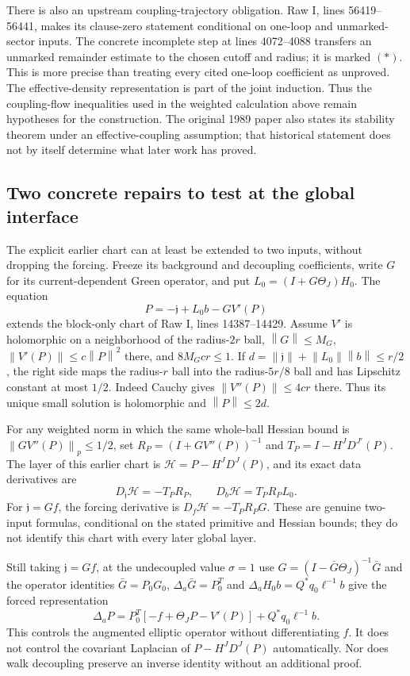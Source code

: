 \documentclass[11pt]{article}
\theoremstyle{remark}
\newcommand{\norm}[1]{\left\|#1\right\|}
\begin{document}
There is also an upstream coupling-trajectory obligation. Raw I,
lines 56419--56441, makes its clause-zero statement conditional on
one-loop and unmarked-sector inputs. The concrete incomplete step at
lines 4072--4088 transfers an unmarked remainder estimate to the chosen
cutoff and radius; it is marked $(*)$. This is more precise than
treating every cited one-loop coefficient as unproved. The
effective-density representation is part of the joint induction.
Thus the coupling-flow inequalities used in the weighted calculation
above remain hypotheses for the construction. The original 1989 paper
also states its stability theorem under an effective-coupling
assumption; that historical statement does not by itself determine
what later work has proved.

\subsection{Two concrete repairs to test at the global interface}

The explicit earlier chart can at least be extended to two inputs,
without dropping the forcing. Freeze its background and decoupling
coefficients, write $G$ for its current-dependent Green operator, and
put $L_0=(I+G\Theta_J)H_0$. The equation
\[
 P=-\mathfrak j+L_0b-GV'(P)
\]
extends the block-only chart of Raw I, lines 14387--14429.
Assume $V'$ is holomorphic on a neighborhood of the radius-$2r$ ball,
$\norm G\le M_G$, $\norm{V'(P)}\le c\norm P^2$ there, and
$8M_Gcr\le1$. If
$d=\norm{\mathfrak j}+\norm{L_0}\norm b\le r/2$, the right side
maps the radius-$r$ ball into the radius-$5r/8$ ball and has Lipschitz
constant at most $1/2$. Indeed Cauchy gives
$\norm{V''(P)}\le4cr$ there. Thus its unique small solution is
holomorphic and $\norm P\le2d$.

For any weighted norm in which the same whole-ball Hessian bound is
$\norm{GV''(P)}_p\le1/2$, set
$R_P=(I+GV''(P))^{-1}$ and
$T_P=I-H^JD^{J\prime}(P)$. The layer of this earlier chart is
$\mathcal H=P-H^JD^J(P)$, and its exact data derivatives are
\[
 D_{\mathfrak j}\mathcal H=-T_PR_P,\qquad
 D_b\mathcal H=T_PR_PL_0.
\]
For $\mathfrak j=Gf$, the forcing derivative is
$D_f\mathcal H=-T_PR_PG$.
These are genuine two-input formulas, conditional on the stated
primitive and Hessian bounds; they do not identify this chart with
every later global layer.

Still taking $\mathfrak j=Gf$, at the undecoupled value $\sigma=1$ use
$G=(I-\bar G\Theta_J)^{-1}\bar G$ and the operator identities
$\bar G=P_0G_0$, $\Delta_a\bar G=P_0^T$ and
$\Delta_aH_0b=Q^*q_0\ell^{-1}b$ give the forced representation
\[
 \Delta_aP=P_0^T[-f+\Theta_JP-V'(P)]+Q^*q_0\ell^{-1}b.
\]
This controls the augmented elliptic operator without differentiating
$f$. It does not control the covariant Laplacian of
$P-H^JD^J(P)$ automatically. Nor does walk decoupling preserve an
inverse identity without an additional proof.
\end{document}
